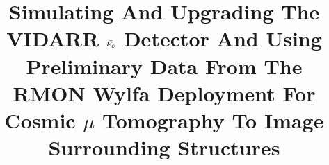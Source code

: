 \usepackage{graphicx}
\graphicspath{{Fig/}}
\usepackage[parfill]{parskip}
\usepackage{rotating}

\title{Simulating And Upgrading The VIDARR $\Bar{\nu_e}$ Detector And Using Preliminary Data From The RMON Wylfa Deployment For Cosmic $\mu$ Tomography To Image Surrounding Structures}









     
